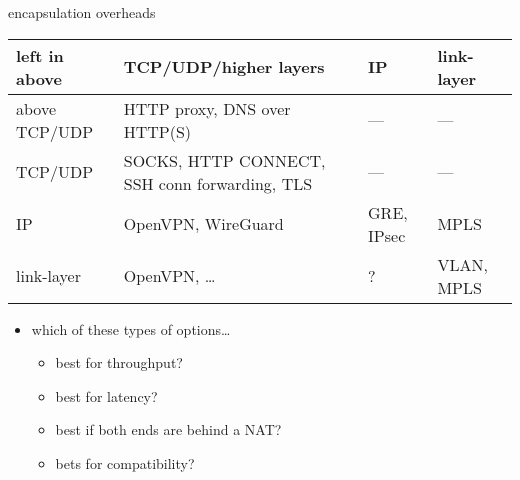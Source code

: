 \begin{frame}{encapsulation overheads}
{\fontsize{9}{10}\selectfont
\begin{tabular}{l||p{4cm}|p{4cm}|p{2cm}}
left in above       & TCP/UDP/higher layers & IP & link-layer \\ \hline \hline
above TCP/UDP       & HTTP proxy, DNS over HTTP(S) & --- & --- \\ \hline
TCP/UDP             & SOCKS, HTTP CONNECT, SSH conn forwarding, TLS & --- & --- \\\hline
IP                  & OpenVPN, WireGuard & GRE, IPsec & MPLS \\\hline
link-layer          & OpenVPN, \ldots & ? & VLAN, MPLS \\\hline
\end{tabular}
}
\begin{itemize}
\item which of these types of options\ldots
    \begin{itemize}
    \item best for throughput?
    \item best for latency?
    \item best if both ends are behind a NAT?
    \item bets for compatibility?
    \end{itemize}
\end{itemize}
\end{frame}
